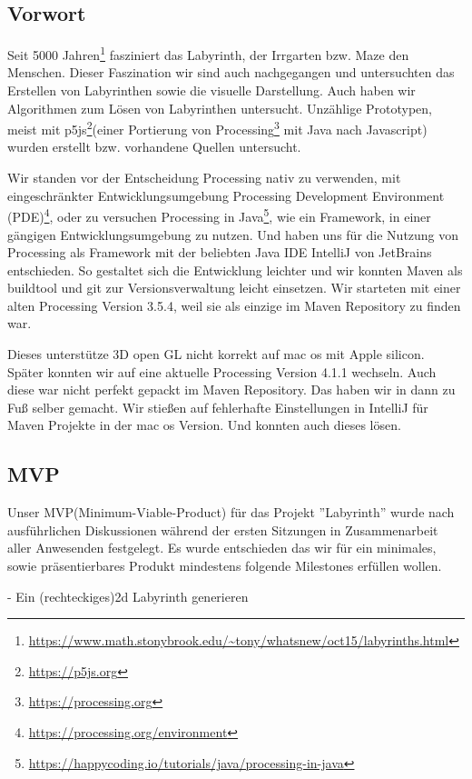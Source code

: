 
\subsection{Vorwort}\label{subsec:Vorwort}

	Seit 5000 Jahren\footnote{\url{https://www.math.stonybrook.edu/~tony/whatsnew/oct15/labyrinths.html}} fasziniert das Labyrinth, der Irrgarten bzw. Maze den Menschen. Dieser Faszination wir sind auch nachgegangen und untersuchten das Erstellen von Labyrinthen sowie die visuelle Darstellung. Auch haben wir Algorithmen zum Lösen von Labyrinthen untersucht. Unzählige Prototypen, meist mit p5js\footnote{\url{https://p5js.org}}(einer Portierung von Processing\footnote{\url{https://processing.org}} mit Java nach Javascript) wurden erstellt bzw. vorhandene Quellen untersucht.

	Wir standen vor der Entscheidung Processing nativ zu verwenden, mit eingeschränkter Entwicklungsumgebung Processing Development Environment (PDE)\footnote{\url{https://processing.org/environment}}, oder zu versuchen Processing in Java\footnote{\url{https://happycoding.io/tutorials/java/processing-in-java}}, wie ein Framework, in einer gängigen Entwicklungsumgebung zu nutzen. Und haben uns für die Nutzung von Processing als Framework mit der beliebten Java IDE IntelliJ von JetBrains entschieden. So gestaltet sich die Entwicklung leichter und wir konnten Maven als buildtool und git zur Versionsverwaltung leicht einsetzen. Wir starteten mit einer alten Processing Version 3.5.4, weil sie als einzige im Maven Repository zu finden war.

	Dieses unterstütze 3D open GL nicht korrekt auf mac os mit Apple silicon. Später konnten wir auf eine aktuelle Processing Version 4.1.1 wechseln. Auch diese war nicht perfekt gepackt im Maven Repository. Das haben wir in dann zu Fuß selber gemacht. Wir stießen auf fehlerhafte Einstellungen in IntelliJ für Maven Projekte in der mac os Version. Und konnten auch dieses lösen.
\subsection{MVP}\label{subsec:mvp}
	Unser MVP(Minimum-Viable-Product) für das Projekt ''Labyrinth'' wurde nach ausführlichen Diskussionen während der ersten Sitzungen in Zusammenarbeit aller Anwesenden festgelegt. Es wurde entschieden das wir für ein minimales, sowie präsentierbares Produkt mindestens folgende Milestones erfüllen wollen.

	- Ein (rechteckiges)2d Labyrinth generieren
		
